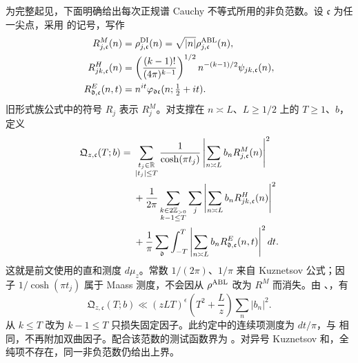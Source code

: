 为完整起见，下面明确给出每次正规谱 Cauchy 不等式所用的非负范数。设 $\mathfrak c$ 为任一尖点，采用 \cite[Proposition E]{Pascadi} 的记号，写作
\begin{align*}
 R^M_{j,\mathfrak c}(n)&=
       \rho^{\rm DI}_{j,\mathfrak c}(n)
       =\sqrt{|n|}\rho^{\rm ABL}_{j,\mathfrak c}(n),\\
 R^H_{jk,\mathfrak c}(n)&=
       \left(\frac{(k-1)!}{(4\pi)^{k-1}}\right)^{1/2}
       n^{-(k-1)/2}\psi_{jk,\mathfrak c}(n),\\
 R^E_{\mathfrak d,\mathfrak c}(n,t)&=
       n^{it}\varphi_{\mathfrak d\mathfrak c}
                       (n;\tfrac12+it).
\end{align*}
旧形式族公式中的符号 $R_j$ 表示 $R_j^M$。对支撑在 $n\asymp L$、$L\ge1/2$ 上的 $T\ge1$、$b$，定义
\begin{align}\label{ana:regular-norm}
 \mathfrak Q_{z,\mathfrak c}(T;b)
 ={}&\sum_{\substack{t_j\in\mathbb R\\|t_j|\le T}}
 \frac1{\cosh(\pi t_j)}
 \left|\sum_{n\asymp L}b_nR^M_{j,\mathfrak c}(n)\right|^2\notag\\
 &+\frac1{2\pi}\sum_{\substack{k\in2\mathbb Z_{>0}\\k-1\le T}}
      \sum_j\left|\sum_{n\asymp L}b_nR^H_{jk,\mathfrak c}(n)\right|^2
       \notag\\
 &+\frac1\pi\sum_{\mathfrak d}\int_{-T}^T
      \left|\sum_{n\asymp L}b_n
                 R^E_{\mathfrak d,\mathfrak c}(n,t)\right|^2dt.
\end{align}
这就是前文使用的直和测度 $d\mu_z$。常数 $1/(2\pi)$、$1/\pi$ 来自 Kuznetsov 公式；因子 $1/\cosh(\pi t_j)$ 属于 Maass 测度，不会因从 $\rho^{\rm ABL}$ 改为 $R^M$ 而消失。由 \cite[Proposition 4.7]{Drappeau}、\cite[Lemma H]{Pascadi}，有
\begin{equation}\label{ana:regular-large-sieve}
 \mathfrak Q_{z,\mathfrak c}(T;b)
 \ll (zLT)^\epsilon\left(T^2+\frac Lz\right)\sum_n|b_n|^2.
\end{equation}
从 $k\le T$ 改为 $k-1\le T$ 只损失固定因子。此约定中的连续项测度为 $dt/\pi$，与 \cite[(3.27)]{Pascadi} 相同，不再附加双曲因子。配合该范数的测试函数界为 \cite[Lemma D]{Pascadi}。对异号 Kuznetsov 和，全纯项不存在，同一非负范数仍给出上界。

